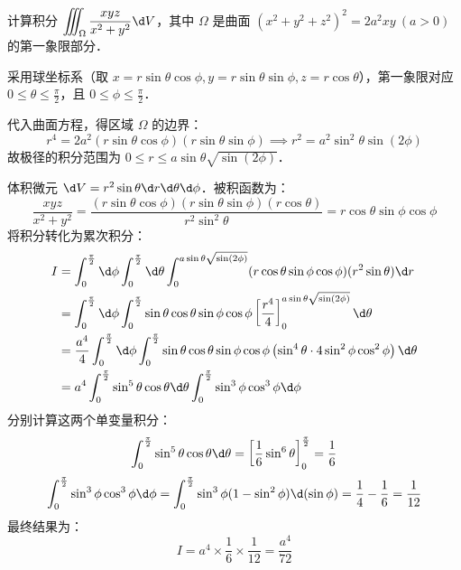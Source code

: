 \documentclass[12pt, a4paper, oneside, UTF8]{ctexbook}
\begin{document}
\begin{exercise}
    计算积分 $\displaystyle\iiint_\Omega \dfrac{xyz}{x^2+y^2}\d V$，其中 $\Omega$ 是曲面 $(x^2+y^2+z^2)^2=2a^2xy\ (a>0)$ 的第一象限部分． 
\end{exercise} 
\begin{solution}
采用球坐标系（取 $x=r\sin\theta\cos\phi, y=r\sin\theta\sin\phi, z=r\cos\theta$），第一象限对应 $0 \le \theta \le \frac{\pi}{2}$，且 $0 \le \phi \le \frac{\pi}{2}$．

代入曲面方程，得区域 $\Omega$ 的边界：
\[ r^4 = 2a^2(r\sin\theta\cos\phi)(r\sin\theta\sin\phi) \implies r^2 = a^2\sin^2\theta\sin(2\phi) \]
故极径的积分范围为 $0 \le r \le a\sin\theta\sqrt{\sin(2\phi)}$．

体积微元 $\d V = r^2\sin\theta \d r\d\theta\d\phi$．被积函数为：
\[ \frac{xyz}{x^2+y^2} = \frac{(r\sin\theta\cos\phi)(r\sin\theta\sin\phi)(r\cos\theta)}{r^2\sin^2\theta} = r\cos\theta\sin\phi\cos\phi \]
将积分转化为累次积分：
\begin{align*}
    I &= \int_0^{\frac{\pi}{2}} \d\phi \int_0^{\frac{\pi}{2}} \d\theta \int_0^{a\sin\theta\sqrt{\sin(2\phi)}} (r\cos\theta\sin\phi\cos\phi)(r^2\sin\theta) \d r \\
      &= \int_0^{\frac{\pi}{2}} \d\phi \int_0^{\frac{\pi}{2}} \sin\theta\cos\theta\sin\phi\cos\phi \left[ \frac{r^4}{4} \right]_0^{a\sin\theta\sqrt{\sin(2\phi)}} \d\theta \\
      &= \frac{a^4}{4} \int_0^{\frac{\pi}{2}} \d\phi \int_0^{\frac{\pi}{2}} \sin\theta\cos\theta\sin\phi\cos\phi \left( \sin^4\theta \cdot 4\sin^2\phi\cos^2\phi \right) \d\theta \\
      &= a^4 \int_0^{\frac{\pi}{2}} \sin^5\theta\cos\theta \d\theta \int_0^{\frac{\pi}{2}} \sin^3\phi\cos^3\phi \d\phi
\end{align*}
分别计算这两个单变量积分：
\[ \int_0^{\frac{\pi}{2}} \sin^5\theta\cos\theta \d\theta = \left[ \frac{1}{6}\sin^6\theta \right]_0^{\frac{\pi}{2}} = \frac{1}{6} \]
\[ \int_0^{\frac{\pi}{2}} \sin^3\phi\cos^3\phi \d\phi = \int_0^{\frac{\pi}{2}} \sin^3\phi (1-\sin^2\phi) \d(\sin\phi) = \frac{1}{4} - \frac{1}{6} = \frac{1}{12} \]
最终结果为：
\[ I = a^4 \times \frac{1}{6} \times \frac{1}{12} = \boxed{\frac{a^4}{72}} \]
\end{solution}
\end{document}
